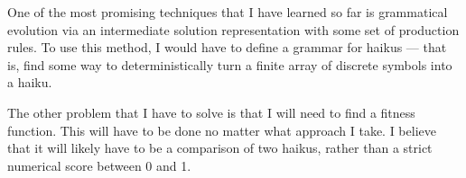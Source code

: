 One of the most promising techniques that I have learned so far is grammatical evolution via an
intermediate solution representation with some set of production rules. To use this method, I would
have to define a grammar for haikus --- that is, find some way to deterministically turn a finite
array of discrete symbols into a haiku.

The other problem that I have to solve is that I will need to find a fitness function. This will
have to be done no matter what approach I take. I believe that it will likely have to be a
comparison of two haikus, rather than a strict numerical score between 0 and 1.
